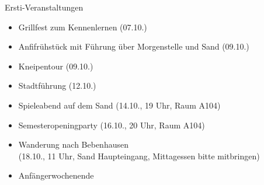 \documentclass{beamer}
\begin{document}
	\begin{frame}{Ersti-Veranstaltungen}
		\begin{itemize}
			\item Grillfest zum Kennenlernen (07.10.)
			\item Anfifrühstück mit Führung über Morgenstelle und Sand (09.10.)
			\item Kneipentour (09.10.)
			\item Stadtführung (12.10.)
			\item Spieleabend auf dem Sand (14.10., 19 Uhr, Raum A104)
			\item Semesteropeningparty (16.10., 20 Uhr, Raum A104)
			\item Wanderung nach Bebenhausen \\ (18.10., 11 Uhr, Sand Haupteingang, Mittagessen bitte mitbringen) 
			\item Anfängerwochenende
		\end{itemize}
	\end{frame}





	
\end{document}
